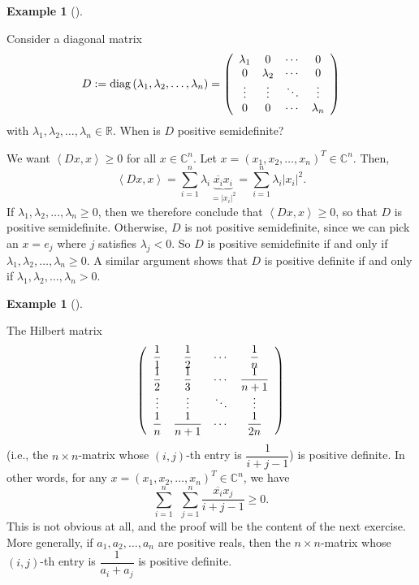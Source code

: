\documentclass[numbers=enddot,12pt,final,onecolumn,notitlepage]{scrartcl}%
\newcounter{exer}
\numberwithin{exer}{subsection}
\theoremstyle{definition}
\newtheorem{exam}[theo]{Example}
\newenvironment{example}[1][]
{\begin{exam}[#1]\begin{leftbar}}
{\end{leftbar}\end{exam}}
\let\sumnonlimits\sum
\renewcommand{\sum}{\sumnonlimits\limits}
\begin{document}
\begin{example}
Consider a diagonal matrix
\[
D:=\operatorname*{diag}\left(  \lambda_{1},\lambda_{2},\ldots,\lambda
_{n}\right)  =\left(
\begin{array}
[c]{cccc}%
\lambda_{1} & 0 & \cdots & 0\\
0 & \lambda_{2} & \cdots & 0\\
\vdots & \vdots & \ddots & \vdots\\
0 & 0 & \cdots & \lambda_{n}%
\end{array}
\right)
\]
with $\lambda_{1},\lambda_{2},\ldots,\lambda_{n}\in\mathbb{R}$. When is $D$
positive semidefinite?

We want $\left\langle Dx,x\right\rangle \geq0$ for all $x\in\mathbb{C}^{n}$.
Let $x=\left(  x_{1},x_{2},\ldots,x_{n}\right)  ^{T}\in\mathbb{C}^{n}$. Then,%
\[
\left\langle Dx,x\right\rangle =\sum_{i=1}^{n}\lambda_{i}\underbrace{\overline
{x_{i}}x_{i}}_{=\left\vert x_{i}\right\vert ^{2}}=\sum_{i=1}^{n}\lambda
_{i}\left\vert x_{i}\right\vert ^{2}.
\]
If $\lambda_{1},\lambda_{2},\ldots,\lambda_{n}\geq0$, then we therefore
conclude that $\left\langle Dx,x\right\rangle \geq0$, so that $D$ is positive
semidefinite. Otherwise, $D$ is not positive semidefinite, since we can pick
an $x=e_{j}$ where $j$ satisfies $\lambda_{j}<0$. So $D$ is positive
semidefinite if and only if $\lambda_{1},\lambda_{2},\ldots,\lambda_{n}\geq0$.
A similar argument shows that $D$ is positive definite if and only if
$\lambda_{1},\lambda_{2},\ldots,\lambda_{n}>0$.
\end{example}

\begin{example}
The Hilbert matrix%
\[
\left(
\begin{array}
[c]{cccc}%
\dfrac{1}{1} & \dfrac{1}{2} & \cdots & \dfrac{1}{n}\\
\dfrac{1}{2} & \dfrac{1}{3} & \cdots & \dfrac{1}{n+1}\\
\vdots & \vdots & \ddots & \vdots\\
\dfrac{1}{n} & \dfrac{1}{n+1} & \cdots & \dfrac{1}{2n}%
\end{array}
\right)
\]
(i.e., the $n\times n$-matrix whose $\left(  i,j\right)  $-th entry is
$\dfrac{1}{i+j-1}$) is positive definite. In other words, for any $x=\left(
x_{1},x_{2},\ldots,x_{n}\right)  ^{T}\in\mathbb{C}^{n}$, we have%
\[
\sum_{i=1}^{n}\ \ \sum_{j=1}^{n}\dfrac{\overline{x_{i}}x_{j}}{i+j-1}\geq0.
\]
This is not obvious at all, and the proof will be the content of the next
exercise. More generally, if $a_{1},a_{2},\ldots,a_{n}$ are positive reals,
then the $n\times n$-matrix whose $\left(  i,j\right)  $-th entry is
$\dfrac{1}{a_{i}+a_{j}}$ is positive definite.
\end{example}
\end{document}
